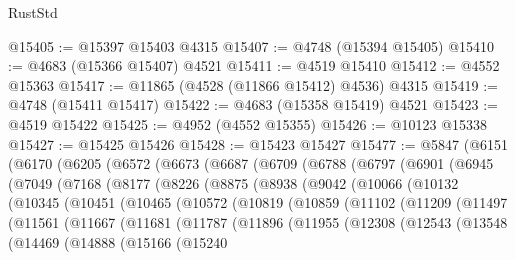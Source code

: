 \begin{lexlean}{RustStd}
\begin{coremodule}
@15405 := @15397 @15403 @4315
@15407 := @4748 (@15394 @15405)
@15410 := @4683 (@15366 @15407) @4521
@15411 := @4519 @15410
@15412 := @4552 @15363
@15417 := @11865 (@4528 (@11866 @15412) @4536) @4315
@15419 := @4748 (@15411 @15417)
@15422 := @4683 (@15358 @15419) @4521
@15423 := @4519 @15422
@15425 := @4952 (@4552 @15355)
@15426 := @10123 @15338
@15427 := @15425 @15426
@15428 := @15423 @15427
@15477 := @5847
    (@6151
      (@6170
        (@6205
          (@6572
            (@6673
              (@6687
                (@6709
                  (@6788
                    (@6797
                      (@6901
                        (@6945
                          (@7049
                            (@7168
                              (@8177
                                (@8226
                                  (@8875
                                    (@8938
                                      (@9042
                                        (@10066
                                          (@10132
                                            (@10345
                                              (@10451
                                                (@10465
                                                  (@10572
                                                    (@10819
                                                      (@10859
                                                        (@11102
                                                          (@11209
                                                            (@11497
                                                              (@11561
                                                                (@11667
                                                                  (@11681
                                                                    (@11787
                                                                      (@11896
                                                                        (@11955
                                                                          (@12308
                                                                            (@12543
                                                                              (@13548
                                                                                (@14469
                                                                                  (@14888
                                                                                    (@15166
                                                                                      (@15240

\end{coremodule}
\end{lexlean}
